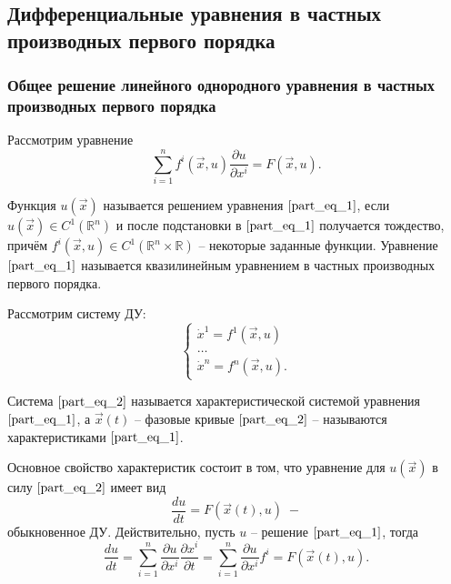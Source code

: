 \subsection{Дифференциальные уравнения в частных производных первого порядка}

\subsubsection{Общее решение линейного однородного уравнения в частных производных первого порядка}

\begin{definition}
    Рассмотрим уравнение
    \begin{equation}
        \sum \limits_{i = 1}^{n} f^{i} \left( \vec{x}, u \right) \frac{\partial u}{\partial x^{i}} = F \left( \vec{x}, u \right).
        \label{part_eq_1}
    \end{equation}
    
    Функция $u \left( \vec{x} \right)$ называется решением уравнения $\eqref{part_eq_1}$, если $u \left( \vec{x} \right) \in C^{1} \left( \mathbb{R}^n \right)$ и после подстановки в $\eqref{part_eq_1}$ получается тождество, причём $f^{i} \left( \vec{x}, u \right) \in C^{1} \left( \mathbb{R}^n \times \mathbb{R} \right)$ -- некоторые заданные функции. Уравнение $\eqref{part_eq_1}$ называется квазилинейным уравнением в частных производных первого порядка. 
\end{definition}

\begin{definition}
    Рассмотрим систему ДУ:
    \begin{equation}
        \begin{cases}
            \dot{x}^1 = f^1 \left( \vec{x}, u \right) \\
            \dots                                     \\
            \dot{x}^n = f^n \left( \vec{x}, u \right).
        \end{cases}
        \label{part_eq_2}
    \end{equation}
    
    Система $\eqref{part_eq_2}$ называется характеристической системой уравнения $\eqref{part_eq_1}$, а $\vec{x} \left( t \right) $ -- фазовые кривые $\eqref{part_eq_2}$ -- называются характеристиками $\eqref{part_eq_1}$.
\end{definition}

Основное свойство характеристик состоит в том, что уравнение для $u \left( \vec{x} \right) $ в силу $\eqref{part_eq_2}$ имеет вид 
\begin{equation*}
    \frac{du}{dt} = F \left( \vec{x} \left( t \right) , u \right) \; -
\end{equation*}
обыкновенное ДУ. Действительно, пусть $u$ -- решение $\eqref{part_eq_1}$, тогда 
\begin{equation*}
    \frac{du}{dt} = \sum \limits_{i = 1}^{n} \frac{\partial u}{\partial x^i} \frac{\partial x^i}{\partial t} = \sum \limits_{i = 1}^{n} \frac{\partial u}{\partial x^i} f^i = F \left( \vec{x} \left( t \right) , u \right).
\end{equation*}

